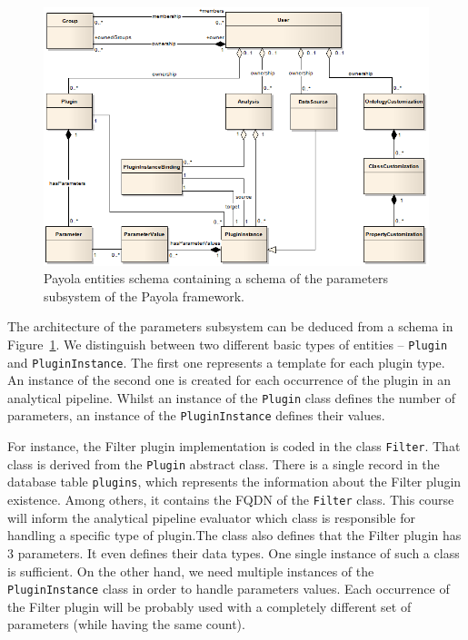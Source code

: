\begin{figure}
	\centering
	\includegraphics[width=140mm]{img/params-schema.png}
	\caption{Payola entities schema containing a schema of the parameters 
	subsystem of the Payola framework.~\cite{payola-devguide}}
	\label{fig:params-schema}
\end{figure}

The architecture of the parameters subsystem can be deduced
from a schema in Figure~\ref{fig:params-schema}. We distinguish between two 
different basic types of entities -- \texttt{Plugin} and \texttt{PluginInstance}. The first 
one represents a template for each plugin type. An instance of the second one is created for
each occurrence of the plugin in an analytical pipeline. Whilst an instance of the \texttt{Plugin}
class defines the number of parameters, an instance of the \texttt{PluginInstance} 
defines their values.

For instance, the Filter plugin implementation is coded in the class \texttt{Filter}.
That class is derived from the \texttt{Plugin} abstract class. There is a single record in the database table
\texttt{plugins}, which represents the information about the Filter plugin existence.
Among others, it contains the FQDN of the \texttt{Filter} class. This course will inform the analytical
pipeline evaluator which class is responsible for handling
a specific type of plugin.The class also defines that the Filter plugin has 3 parameters. It even 
defines their data types. One single instance of such a class is sufficient. On the other hand, we need
multiple instances of the \texttt{PluginInstance} class in order to
handle parameters values. Each occurrence of the Filter plugin will be probably 
used with a completely different set of parameters (while having the same count).

